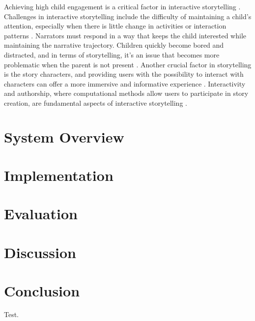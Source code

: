 \documentclass[submit,techrep,english]{ipsj}
\begin{document}
Achieving high child engagement is a critical factor in interactive storytelling \cite{12:ZhangXWYRWYWL22}. Challenges in interactive storytelling include the difficulty of maintaining a child's attention, especially when there is little change in activities or interaction patterns \cite{13:abs-2011-04242}. Narrators must respond in a way that keeps the child interested while maintaining the narrative trajectory. Children quickly become bored and distracted, and in terms of storytelling, it's an issue that becomes more problematic when the parent is not present \cite{12:ZhangXWYRWYWL22}. Another crucial factor in storytelling is the story characters, and providing users with the possibility to interact with characters can offer a more immersive and informative experience \cite{10:ChopraVSS21}. Interactivity and authorship, where computational methods allow users to participate in story creation, are fundamental aspects of interactive storytelling \cite{11:LimaGV20}.

\section{System Overview}

\section{Implementation}

\section{Evaluation}

\section{Discussion}

\section{Conclusion}

\begin{acknowledgment}
    Test.
\end{acknowledgment}




\appendix
\end{document}
